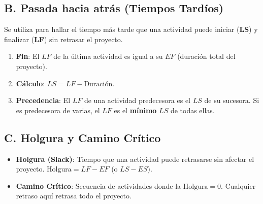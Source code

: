 \documentclass[../main]{subfiles}
\begin{document}
\subsection{B. Pasada hacia atrás (Tiempos Tardíos)}
Se utiliza para hallar el tiempo más tarde que una actividad puede iniciar (\textbf{LS}) y finalizar (\textbf{LF}) sin retrasar el proyecto.
\begin{enumerate}
  \item \textbf{Fin}: El $LF$ de la última actividad es igual a su $EF$ (duración total del proyecto).
  \item \textbf{Cálculo}: $LS = LF - \text{Duración}$.
  \item \textbf{Precedencia}: El $LF$ de una actividad predecesora es el $LS$ de su sucesora. Si es predecesora de varias, el $LF$ es el \textbf{mínimo} $LS$ de todas ellas.
\end{enumerate}

\subsection{C. Holgura y Camino Crítico}
\begin{itemize}
  \item \textbf{Holgura (Slack)}: Tiempo que una actividad puede retrasarse sin afectar el proyecto. $\text{Holgura} = LF - EF$ (o $LS - ES$).
  \item \textbf{Camino Crítico}: Secuencia de actividades donde la $\text{Holgura} = 0$. Cualquier retraso aquí retrasa todo el proyecto.
\end{itemize}



\end{document}

